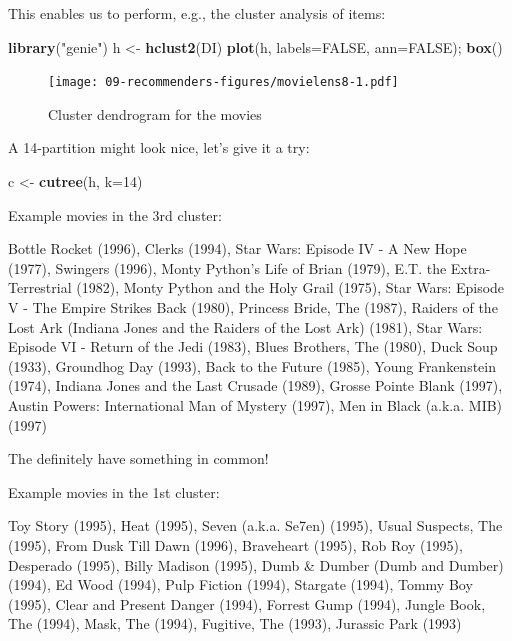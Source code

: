 \documentclass[10pt,b5paper,krantz1]{krantz}
\newenvironment{Shaded}{\begin{snugshade}}{\end{snugshade}}
\newcommand{\DataTypeTok}[1]{\textcolor[rgb]{0.27,0.27,0.27}{#1}}
\newcommand{\DecValTok}[1]{\textcolor[rgb]{0.06,0.06,0.06}{#1}}
\newcommand{\KeywordTok}[1]{\textcolor[rgb]{0.27,0.27,0.27}{\textbf{#1}}}
\newcommand{\NormalTok}[1]{#1}
\newcommand{\OtherTok}[1]{\textcolor[rgb]{0.37,0.37,0.37}{#1}}
\newcommand{\StringTok}[1]{\textcolor[rgb]{0.5,0.5,0.5}{#1}}
\begin{document}
This enables us to perform, e.g., the cluster analysis of items:

\begin{Shaded}
\begin{Highlighting}[]
\KeywordTok{library}\NormalTok{(}\StringTok{"genie"}\NormalTok{)}
\NormalTok{h <-}\StringTok{ }\KeywordTok{hclust2}\NormalTok{(DI)}
\KeywordTok{plot}\NormalTok{(h, }\DataTypeTok{labels=}\OtherTok{FALSE}\NormalTok{, }\DataTypeTok{ann=}\OtherTok{FALSE}\NormalTok{); }\KeywordTok{box}\NormalTok{()}
\end{Highlighting}
\end{Shaded}

\begin{figure}
\hypertarget{fig:movielens8}{%
\centering
\texttt{[image: 09-recommenders-figures/movielens8-1.pdf]}
\caption{Cluster dendrogram for the movies}\label{fig:movielens8}
}
\end{figure}

A 14-partition might look nice, let's give it a try:

\begin{Shaded}
\begin{Highlighting}[]
\NormalTok{c <-}\StringTok{ }\KeywordTok{cutree}\NormalTok{(h, }\DataTypeTok{k=}\DecValTok{14}\NormalTok{)}
\end{Highlighting}
\end{Shaded}

Example movies in the 3rd cluster:

Bottle Rocket (1996), Clerks (1994), Star Wars: Episode IV - A New Hope (1977), Swingers (1996), Monty Python's Life of Brian (1979), E.T. the Extra-Terrestrial (1982), Monty Python and the Holy Grail (1975), Star Wars: Episode V - The Empire Strikes Back (1980), Princess Bride, The (1987), Raiders of the Lost Ark (Indiana Jones and the Raiders of the Lost Ark) (1981), Star Wars: Episode VI - Return of the Jedi (1983), Blues Brothers, The (1980), Duck Soup (1933), Groundhog Day (1993), Back to the Future (1985), Young Frankenstein (1974), Indiana Jones and the Last Crusade (1989), Grosse Pointe Blank (1997), Austin Powers: International Man of Mystery (1997), Men in Black (a.k.a. MIB) (1997)

The definitely have something in common!

Example movies in the 1st cluster:

Toy Story (1995), Heat (1995), Seven (a.k.a. Se7en) (1995), Usual Suspects, The (1995), From Dusk Till Dawn (1996), Braveheart (1995), Rob Roy (1995), Desperado (1995), Billy Madison (1995), Dumb \& Dumber (Dumb and Dumber) (1994), Ed Wood (1994), Pulp Fiction (1994), Stargate (1994), Tommy Boy (1995), Clear and Present Danger (1994), Forrest Gump (1994), Jungle Book, The (1994), Mask, The (1994), Fugitive, The (1993), Jurassic Park (1993)
\end{document}
